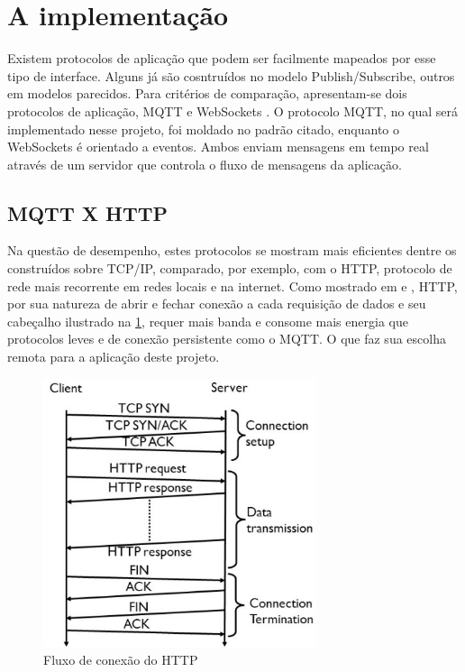 \section{A implementação}
\label{section:implementacao}


Existem protocolos de aplicação que podem ser facilmente mapeados por esse tipo de interface. Alguns já são cosntruídos no modelo Publish/Subscribe, outros em modelos parecidos. Para critérios de comparação, apresentam-se dois protocolos de aplicação, MQTT e WebSockets \cite{websocket}. O protocolo MQTT, no qual será implementado nesse projeto, foi moldado no padrão citado, enquanto o WebSockets é orientado a eventos. Ambos enviam mensagens em tempo real através de um servidor que controla o fluxo de mensagens da aplicação.

\subsection{MQTT X HTTP}
\label{subsection:mqttxhttp}

Na questão de desempenho, estes protocolos se mostram mais eficientes dentre os construídos sobre TCP/IP, comparado, por exemplo, com o HTTP, protocolo de rede mais recorrente em redes locais e na internet. Como mostrado em \cite{Tetsuya-Sasaki} e \cite{Naik}, HTTP, por sua natureza de abrir e fechar conexão a cada requisição de dados e seu cabeçalho ilustrado na \ref{fig:3.2.0/http-flow}, requer mais banda e consome mais energia que protocolos leves e de conexão persistente como o MQTT. O que faz sua escolha remota para a aplicação deste projeto.

\begin{figure}[h]
\centering
\includegraphics[width=8cm]{./02_Capitulos/02_Cap3/figures/http-flow}
\caption{Fluxo de conexão do HTTP}
\label{fig:3.2.0/http-flow}
\end{figure}

